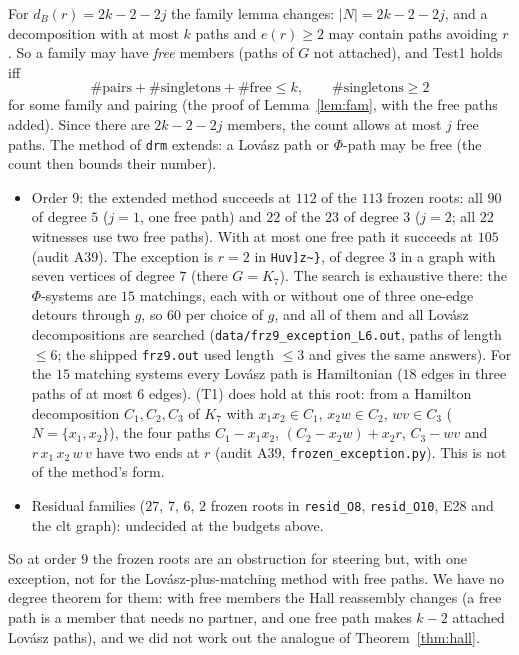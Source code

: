 \documentclass[11pt]{amsart}
\theoremstyle{definition}
\begin{document}
For $d_B(r)=2k-2-2j$ the family lemma changes: $|N|=2k-2-2j$, and a decomposition with at most $k$ paths
and $e(r)\ge2$ may contain paths avoiding $r$. So a family may have \emph{free} members (paths of $G$ not
attached), and Test1 holds iff
\[
\#\text{pairs}+\#\text{singletons}+\#\text{free}\le k,\qquad \#\text{singletons}\ge2
\]
for some family and pairing (the proof of Lemma~\ref{lem:fam}, with the free paths added). Since there
are $2k-2-2j$ members, the count allows at most $j$ free paths. The method of \texttt{drm} extends: a
Lov\'asz path or $\Phi$-path may be free (the count then bounds their number).
\begin{itemize}[leftmargin=*]
\item Order $9$: the extended method succeeds at $112$ of the $113$ frozen roots: all $90$ of degree $5$
($j=1$, one free path) and $22$ of the $23$ of degree $3$ ($j=2$; all $22$ witnesses use two free paths).
With at most one free path it succeeds at $105$ (audit A39). The exception is $r=2$ in
\texttt{Huv]z\textasciitilde\}}, of degree $3$ in a graph with seven vertices of degree $7$ (there
$G=K_7$). The search is exhaustive there: the $\Phi$-systems are $15$ matchings, each with or without one
of three one-edge detours through $g$, so $60$ per choice of $g$, and all of them and all Lov\'asz
decompositions are searched (\texttt{data/frz9\_exception\_L6.out}, paths of length $\le6$; the shipped
\texttt{frz9.out} used length $\le3$ and gives the same answers). For the $15$ matching systems every
Lov\'asz path is Hamiltonian ($18$ edges in three paths of at most $6$ edges). (T1) does hold at this
root: from a Hamilton decomposition $C_1,C_2,C_3$ of $K_7$ with $x_1x_2\in C_1$, $x_2w\in C_2$,
$wv\in C_3$ ($N=\{x_1,x_2\}$), the four paths $C_1-x_1x_2$, $(C_2-x_2w)+x_2r$, $C_3-wv$ and
$r\,x_1\,x_2\,w\,v$ have two ends at $r$ (audit A39, \texttt{frozen\_exception.py}). This is not of the
method's form.
\item Residual families ($27$, $7$, $6$, $2$ frozen roots in \texttt{resid\_O8}, \texttt{resid\_O10},
E28 and the clt graph): undecided at the budgets above.
\end{itemize}
So at order $9$ the frozen roots are an obstruction for steering but, with one exception, not for the
Lov\'asz-plus-matching method with free paths. We have no degree theorem for them:
with free members the Hall reassembly changes (a free path is a member that needs no partner, and one
free path makes $k-2$ attached Lov\'asz paths), and we did not work out the analogue of
Theorem~\ref{thm:hall}.
\end{document}
